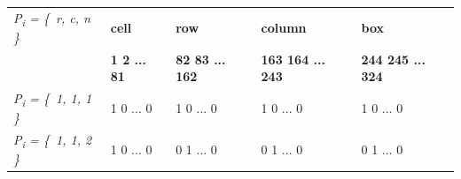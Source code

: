 \documentclass[a4paper,oneside,11pt]{report}
\begin{document}
\begin{tabular}{m{2.5cm} m{3cm} m{3cm} m{3cm} m{3cm}}
{\itshape P\textsubscript{i} = \{\ r, c, n \}} & \textbf{cell} & \textbf{row} & \textbf{column} & \textbf{box}\\ 
& \textbf{1\hspace{0.5cm} 2\hspace{0.5cm} ... \hspace{0.1cm}	81} & \textbf{82\hspace{0.2cm} 83\hspace{0.2cm} ... \hspace{0.3cm}	162} & \textbf{163\hspace{0.2cm} 164\hspace{0.1cm} ... \hspace{0.1cm}	243} & \textbf{244\hspace{0.2cm} 245\hspace{0.1cm} ... \hspace{0.3cm}	324}\\ 
{\itshape P\textsubscript{i} = \{\ 1, 1, 1 \}} & 1\hspace{0.5cm} 0\hspace{0.5cm} ... \hspace{0.2cm} 0 & 1\hspace{0.5cm} 0\hspace{0.3cm} ... \hspace{0.5cm} 0 & 1\hspace{0.7cm} 0\hspace{0.5cm} ... \hspace{0.3cm} 0 & 1\hspace{0.7cm} 0\hspace{0.5cm} ... \hspace{0.3cm} 0\\ 
{\itshape P\textsubscript{i} = \{\ 1, 1, 2 \}} & 1\hspace{0.5cm} 0\hspace{0.5cm} ... \hspace{0.2cm} 0 & 0\hspace{0.5cm} 1\hspace{0.3cm} ... \hspace{0.5cm} 0 & 0\hspace{0.7cm} 1\hspace{0.5cm} ... \hspace{0.3cm} 0 & 0\hspace{0.7cm} 1\hspace{0.5cm} ... \hspace{0.3cm} 0\\ 

\end{tabular}
\end{document}
